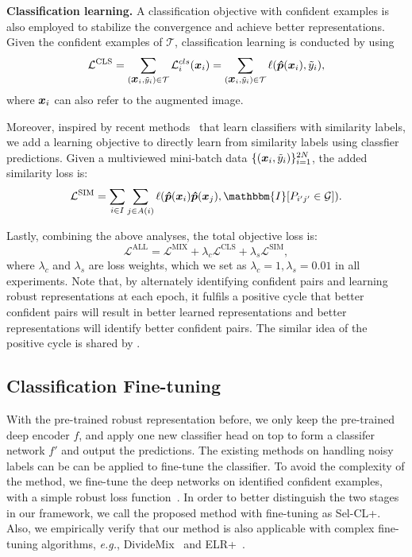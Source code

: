 \documentclass[10pt,twocolumn,letterpaper]{article}
\newcommand{\myPara}[1]{\vspace{.05in}\noindent\textbf{#1}}
\newcommand{\bm}[1]{\mbox{\boldmath{$#1$}}}
\begin{document}
\myPara{Classification learning.}
A classification objective with confident examples is also employed to stabilize the convergence and achieve better representations. Given the confident examples of $\mathcal{T}$, classification learning is conducted by using
\begin{equation}
	\mathcal{L}^{\mathrm{CLS}}=\sum_{(\bm{x}_i,\tilde{y}_i) \in \mathcal{T}}\mathcal{L}^{cls}_i(\bm{x}_i)=\sum_{(\bm{x}_i,\tilde{y}_i) \in \mathcal{T}}\ell(\bm{\hat{p}}(\bm{x}_i), \tilde{y}_i),
\end{equation}
where $\bm{x}_i$ can also refer to the augmented image.

Moreover, inspired by recent methods~\cite{Wu2021icml,Hsu2019iclr} that learn classifiers with similarity labels, we add a learning objective to directly learn from similarity labels using classfier predictions. Given a multiviewed mini-batch data $\{(\bm{x}_i, \tilde{y}_i)\}^{2N}_{i=1}$, the added similarity loss is: 
\begin{equation}
	\mathcal{L}^{\mathrm{SIM}}= \sum_{i \in I}\sum_{j \in A(i)} \ell(\bm{\hat{p}}(\bm{x}_i)\bm{\hat{p}}(\bm{x}_j),\mathbbm{I}[P_{i^{\prime}j^{\prime}} \in \mathcal{G}]).
\end{equation}

Lastly, combining the above analyses, the total objective loss is: 
\begin{equation}
	\mathcal{L}^{\mathrm{ALL}}=\mathcal{L}^{\mathrm{MIX}}+\lambda_c\mathcal{L}^{\mathrm{CLS}}+\lambda_s \mathcal{L}^{\mathrm{SIM}},
	\label{all} 
\end{equation}
where $\lambda_c$ and $\lambda_s$ are loss weights, which we set as $\lambda_c=1,\lambda_s=0.01$ in all experiments. Note that, by alternately identifying confident pairs and learning robust representations at each epoch,  it fulfils a positive cycle that better confident pairs will result in better learned representations and better representations will identify better confident pairs. The similar idea of the positive cycle is shared by \cite{bai2020me}. 

\subsection{Classification Fine-tuning}
With the pre-trained robust representation before, we only keep the pre-trained deep encoder $f$, and apply one new classifier head on top to form a classifer network $f'$ and output the predictions. The existing methods on handling noisy labels can be can be applied to fine-tune the classifier. To avoid the complexity of the method, we fine-tune the deep networks on identified confident examples, with a simple robust loss function~\cite{Ortego2021}. In order to better distinguish the two stages in our framework, we call the proposed method with fine-tuning as Sel-CL+. Also, we empirically verify that our method is also applicable with complex fine-tuning algorithms, \textit{e.g.}, DivideMix~\cite{LiSH20} and ELR+~\cite{LiuNRF20}. 
\end{document}
